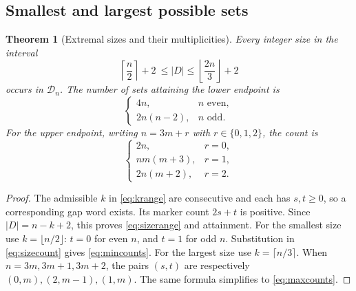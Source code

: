 \documentclass[11pt,letterpaper]{article}
\numberwithin{equation}{section}
\newtheorem{theorem}{Theorem}[section]
\theoremstyle{definition}
\newcommand{\CM}{\mathcal D}
\newcommand{\1}{\mathbf 1}
\begin{document}
\subsection{Smallest and largest possible sets}
\begin{theorem}[Extremal sizes and their multiplicities]\label{thm:extrema}
Every integer size in the interval
\begin{equation}\label{eq:sizerange}
 \left\lceil\frac n2\right\rceil+2
 \ \le |D|\le\left\lfloor\frac{2n}3\right\rfloor+2
\end{equation}
occurs in $\CM_n$. The number of sets attaining the lower endpoint is
\begin{equation}\label{eq:mincounts}
 \begin{cases}
 4n,&n\text{ even},\\
 2n(n-2),&n\text{ odd}.
 \end{cases}
\end{equation}
For the upper endpoint, writing $n=3m+r$ with $r\in\{0,1,2\}$, the count is
\begin{equation}\label{eq:maxcounts}
 \begin{cases}
 2n,&r=0,\\
 nm(m+3),&r=1,\\
 2n(m+2),&r=2.
 \end{cases}
\end{equation}
\end{theorem}
\begin{proof}
The admissible $k$ in \eqref{eq:krange} are consecutive and each has $s,t\ge0$,
so a corresponding gap word exists. Its marker count $2s+t$ is positive.
Since $|D|=n-k+2$, this proves \eqref{eq:sizerange} and attainment.
For the smallest size use $k=\lfloor n/2\rfloor$: $t=0$ for even $n$, and
$t=1$ for odd $n$. Substitution in \eqref{eq:sizecount} gives
\eqref{eq:mincounts}. For the largest size use $k=\lceil n/3\rceil$.
When $n=3m,3m+1,3m+2$, the pairs $(s,t)$ are respectively
$(0,m),(2,m-1),(1,m)$. The same formula simplifies to
\eqref{eq:maxcounts}.
\end{proof}
\end{document}
